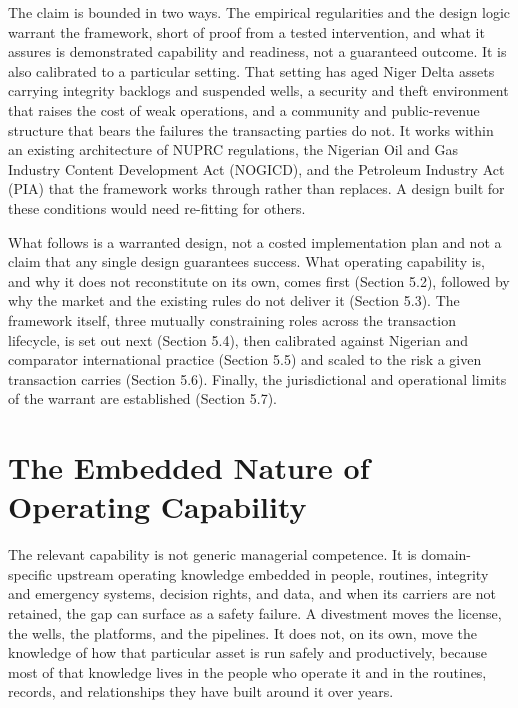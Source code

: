 \documentclass[twoside,fontset=lmodern]{mitthesis}
\begin{document}
The claim is bounded in two ways. The empirical regularities and the
design logic warrant the framework, short of proof from a tested
intervention, and what it assures is demonstrated capability and
readiness, not a guaranteed outcome. It is also calibrated to a
particular setting. That setting has aged Niger Delta assets carrying
integrity backlogs and suspended wells, a security and theft environment
that raises the cost of weak operations, and a community and
public-revenue structure that bears the failures the transacting parties
do not. It works within an existing architecture of NUPRC regulations,
the Nigerian Oil and Gas Industry Content Development Act (NOGICD), and
the Petroleum Industry Act (PIA) that the framework works through rather
than replaces. A design built for these conditions would need re-fitting
for others.

What follows is a warranted design, not a costed implementation plan and
not a claim that any single design guarantees success. What operating
capability is, and why it does not reconstitute on its own, comes first
(Section 5.2), followed by why the market and the existing rules do not
deliver it (Section 5.3). The framework itself, three mutually
constraining roles across the transaction lifecycle, is set out next
(Section 5.4), then calibrated against Nigerian and comparator
international practice (Section 5.5) and scaled to the risk a given
transaction carries (Section 5.6). Finally, the jurisdictional and
operational limits of the warrant are established (Section 5.7).

\hypertarget{the-embedded-nature-of-operating-capability}{%
\section{The Embedded Nature of Operating
Capability}\label{the-embedded-nature-of-operating-capability}}

The relevant capability is not generic managerial competence. It is
domain-specific upstream operating knowledge embedded in people,
routines, integrity and emergency systems, decision rights, and data,
and when its carriers are not retained, the gap can surface as a safety
failure. A divestment moves the license, the wells, the platforms, and
the pipelines. It does not, on its own, move the knowledge of how that
particular asset is run safely and productively, because most of that
knowledge lives in the people who operate it and in the routines,
records, and relationships they have built around it over years.
\end{document}
